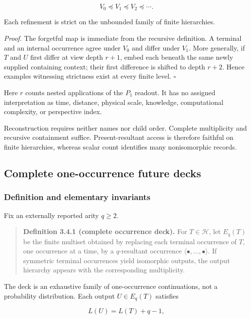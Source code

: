 \documentclass[11pt,a4paper]{article}
\begin{document}
\[V_{0} \preccurlyeq V_{1} \preccurlyeq V_{2} \preccurlyeq \cdots.\]

Each refinement is strict on the unbounded family of finite hierarchies.

\emph{Proof.} The forgetful map is immediate from the recursive
definition. A terminal and an internal occurrence agree under \(V_{0}\)
and differ under \(V_{1}\). More generally, if \(T\) and \(U\) first
differ at view depth \(r + 1\), embed each beneath the same newly
supplied containing context; their first difference is shifted to depth
\(r + 2\). Hence examples witnessing strictness exist at every finite
level. \(\ensuremath{\square}\)

Here \(r\) counts nested applications of the \(P_{1}\) readout. It has
no assigned interpretation as time, distance, physical scale, knowledge,
computational complexity, or perspective index.

Reconstruction requires neither names nor child order. Complete
multiplicity and recursive containment suffice. Present-resultant access
is therefore faithful on finite hierarchies, whereas scalar count
identifies many nonisomorphic records.

\subsection{Complete one-occurrence future
decks}

\subsubsection{Definition and elementary
invariants}

Fix an externally reported arity \(q \geq 2\).

\begin{quote}
\textbf{Definition 3.4.1 (complete occurrence deck).} For
\(T \in \mathcal{H}\), let \(E_{q}(T)\) be the finite multiset obtained
by replacing each terminal occurrence of \(T\), one occurrence at a
time, by a \(q\)-resultant occurrence
\(\langle \bullet ,\ldots, \bullet \rangle\). If symmetric terminal
occurrences yield isomorphic outputs, the output hierarchy appears with
the corresponding multiplicity.
\end{quote}

The deck is an exhaustive family of one-occurrence continuations, not a
probability distribution. Each output \(U \in E_{q}(T)\) satisfies

\[L(U) = L(T) + q - 1,\]
\end{document}
